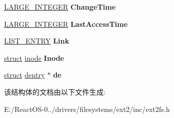 \begin{DoxyCompactItemize}
\mbox{\label{struct___e_x_t2___m_c_b_afbee3db8ce011a781a80c53078060fa8}} 
\hyperlink{union___l_a_r_g_e___i_n_t_e_g_e_r}{L\+A\+R\+G\+E\+\_\+\+I\+N\+T\+E\+G\+ER} {\bfseries Change\+Time}
\item 
\mbox{\label{struct___e_x_t2___m_c_b_a9c51163e1bb67a815e3e1038396818c2}} 
\hyperlink{union___l_a_r_g_e___i_n_t_e_g_e_r}{L\+A\+R\+G\+E\+\_\+\+I\+N\+T\+E\+G\+ER} {\bfseries Last\+Access\+Time}
\item 
\mbox{\label{struct___e_x_t2___m_c_b_aa12cff086219ad88a6860e9e4dfd1ed5}} 
\hyperlink{struct___l_i_s_t___e_n_t_r_y}{L\+I\+S\+T\+\_\+\+E\+N\+T\+RY} {\bfseries Link}
\item 
\mbox{\label{struct___e_x_t2___m_c_b_adc9fd2f6805aee6bb1800b1c1319c36a}} 
\hyperlink{interfacestruct}{struct} \hyperlink{structinode}{inode} {\bfseries Inode}
\item 
\mbox{\label{struct___e_x_t2___m_c_b_a026947791e3bdc9bc5d89b28538d412e}} 
\hyperlink{interfacestruct}{struct} \hyperlink{structdentry}{dentry} $\ast$ {\bfseries de}
\end{DoxyCompactItemize}


该结构体的文档由以下文件生成\+:\begin{DoxyCompactItemize}
\item 
E\+:/\+React\+O\+S-\/0../drivers/filesystems/ext2/inc/ext2fs.\+h\end{DoxyCompactItemize}
